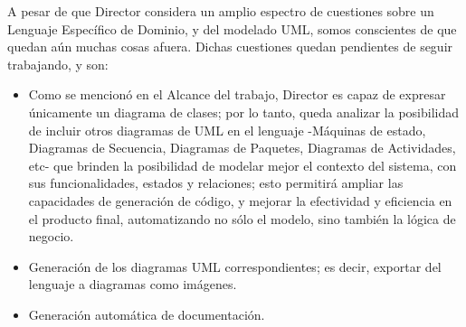 A pesar de que Director considera un amplio espectro de cuestiones sobre un Lenguaje Específico
de Dominio, y del modelado UML, somos conscientes de que quedan aún muchas cosas afuera. Dichas
cuestiones quedan pendientes de seguir trabajando, y son:
\begin{itemize}
  \item Como se mencionó en el Alcance del trabajo, Director es capaz de expresar únicamente un
    diagrama de clases; por lo tanto, queda analizar la posibilidad de incluir otros diagramas de
    UML en el lenguaje -Máquinas de estado, Diagramas de Secuencia, Diagramas de Paquetes, Diagramas
    de Actividades, etc- que brinden la posibilidad de modelar mejor el contexto del sistema, con sus
    funcionalidades, estados y relaciones; esto permitirá ampliar las capacidades de generación de código,
    y mejorar la efectividad y eficiencia en el producto final, automatizando no sólo el modelo, sino
    también la lógica de negocio.
  \item Generación de los diagramas UML correspondientes; es decir, exportar del lenguaje a diagramas
    como imágenes.
  \item Generación automática de documentación.
\end{itemize}
